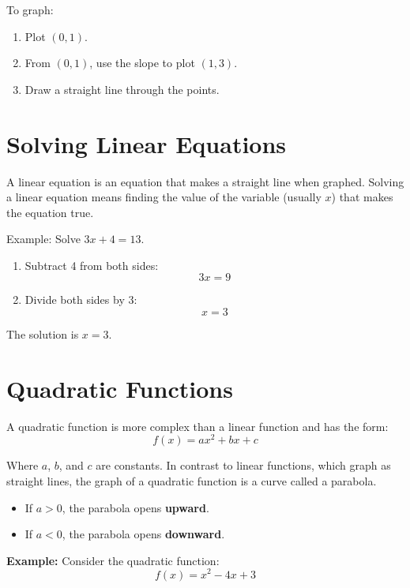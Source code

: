 To graph:

\begin{enumerate}
    \item Plot \( (0, 1) \).
    \item From \((0, 1)\), use the slope to plot \((1, 3)\).
    \item Draw a straight line through the points.
\end{enumerate}


\section{Solving Linear Equations}
A linear equation is an equation that makes a straight line when graphed. Solving a linear equation means finding the value of the variable (usually \( x \)) that makes the equation true.

Example: Solve \( 3x + 4 = 13 \).
\begin{enumerate}
    \item Subtract 4 from both sides:
    \[ 3x = 9 \]
    \item Divide both sides by 3:
    \[ x = 3 \]
\end{enumerate}
The solution is \( x = 3 \).

\section{Quadratic Functions}

A quadratic function is more complex than a linear function and has the form:
\[
f(x) = ax^2 + bx + c
\]

Where \( a \), \( b \), and \( c \) are constants. In contrast to linear functions, which graph as straight lines, the graph of a quadratic function is a curve called a parabola.

\begin{itemize}
    \item If \( a > 0 \), the parabola opens \textbf{upward}.
    \item If \( a < 0 \), the parabola opens \textbf{downward}.
\end{itemize}

\textbf{Example:} Consider the quadratic function:
\[
f(x) = x^2 - 4x + 3
\]

